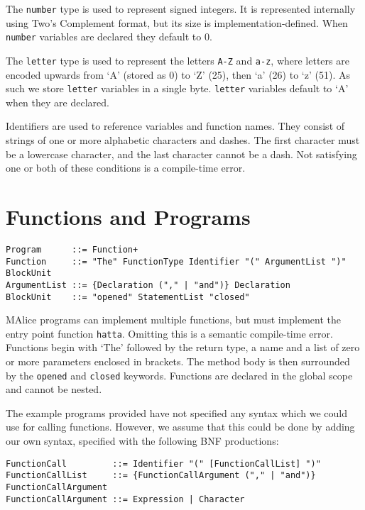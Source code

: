 \documentclass[a4wide, 11pt]{article}
\begin{document}
The \texttt{number} type is used to represent signed integers. It is represented internally using Two's Complement format, but its size is implementation-defined. When \texttt{number} variables are declared they default to 0.

The \texttt{letter} type is used to represent the letters \texttt{A-Z} and \texttt{a-z}, where letters are encoded upwards from `A' (stored as 0) to `Z' (25), then `a' (26) to `z' (51). As such we store \texttt{letter} variables in a single byte. \texttt{letter} variables default to `A' when they are declared.

Identifiers are used to reference variables and function names. They consist of strings of one or more alphabetic characters and dashes. The first character must be a lowercase character, and the last character cannot be a dash. Not satisfying one or both of these conditions is a compile-time error.

\section{Functions and Programs}

\begin{verbatim}
Program      ::= Function+
Function     ::= "The" FunctionType Identifier "(" ArgumentList ")" BlockUnit
ArgumentList ::= {Declaration ("," | "and")} Declaration
BlockUnit    ::= "opened" StatementList "closed"
\end{verbatim}

MAlice programs can implement multiple functions, but must implement the entry point function \texttt{hatta}. Omitting this is a semantic compile-time error. Functions begin with `The' followed by the return type, a name and a list of zero or more parameters enclosed in brackets. The method body is then surrounded by the \texttt{opened} and \texttt{closed} keywords. Functions are declared in the global scope and cannot be nested.

The example programs provided have not specified any syntax which we could use for calling functions. However, we assume that this could be done by adding our own syntax, specified with the following BNF productions:

\begin{verbatim}
FunctionCall         ::= Identifier "(" [FunctionCallList] ")"
FunctionCallList     ::= {FunctionCallArgument ("," | "and")} FunctionCallArgument
FunctionCallArgument ::= Expression | Character
\end{verbatim}
\end{document}

